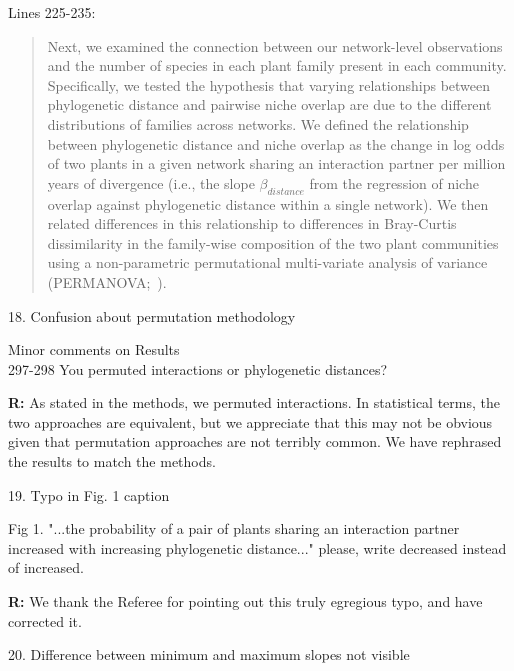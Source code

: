 \documentclass[12pt]{letter}
\newenvironment{refquote}{\bigskip \begin{it}}{\end{it}\smallskip}
\begin{document}
		Lines 225-235:

		\begin{quotation}

			Next, we examined the connection between our network-level observations
			and the number of species in each plant family present in each community.
			Specifically, we tested the hypothesis that
			varying relationships between phylogenetic distance and
			pairwise niche overlap are due to the different distributions 
			of families across networks. We defined the relationship between
			phylogenetic distance and niche overlap as the change in 
			log odds of two plants in a given network sharing an interaction 
			partner per million years of divergence (i.e., the slope $\beta_{distance}$ from the 
			regression of niche overlap against phylogenetic distance within
			a single network). We then related differences in this relationship
			to differences in Bray-Curtis dissimilarity in the family-wise composition of the two plant communities 
			using a non-parametric permutational multi-variate 
			analysis of variance (PERMANOVA;~\citealp{Anderson2001}).

	    \end{quotation}


	18. Confusion about permutation methodology 

		\begin{refquote}
			Minor comments on Results\\
			297-298 You permuted interactions or phylogenetic distances?
		\end{refquote}


		\textbf{R:} As stated in the methods, we permuted interactions. In statistical terms, the two approaches are equivalent, but we appreciate that this may not be obvious given that permutation approaches are not terribly common. We have rephrased the results to match the methods.


	19. Typo in Fig. 1 caption 

		\begin{refquote}
			Fig 1. "...the probability of a pair of plants sharing an interaction partner increased with increasing phylogenetic distance..." please, write decreased instead of increased.
		\end{refquote}


		\textbf{R:} We thank the Referee for pointing out this truly egregious typo, and have corrected it.


	20. Difference between minimum and maximum slopes not visible 
\end{document}
